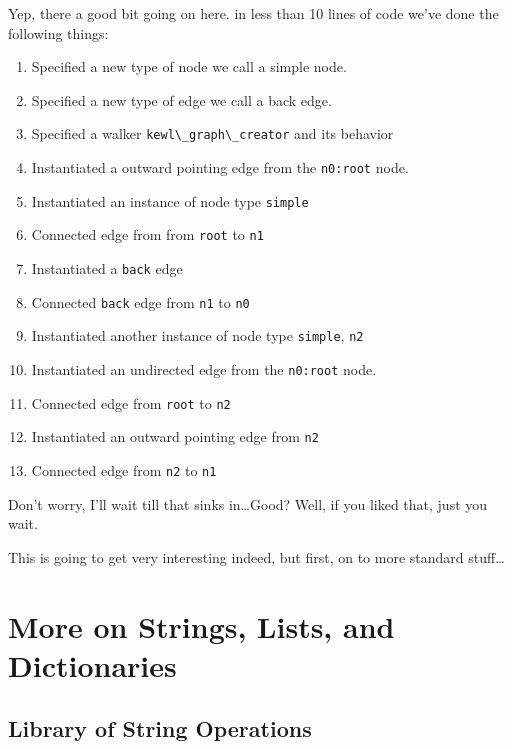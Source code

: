 Yep, there a good bit going on here. in less than 10 lines of code we've done the following things:
\begin{enumerate}[itemsep=0mm]
    \footnotesize
    \item Specified a new type of node we call a simple node.
    \item Specified a new type of edge we call a back edge.
    \item Specified a walker \lstinline{kewl\_graph\_creator} and its behavior
    \item Instantiated a outward pointing edge from the \lstinline{n0:root} node.
    \item Instantiated an instance of node type \lstinline{simple}
    \item Connected edge from from \lstinline{root} to \lstinline{n1}
    \item Instantiated a \lstinline{back} edge
    \item Connected \lstinline{back} edge from \lstinline{n1} to \lstinline{n0}
    \item Instantiated another instance of node type \lstinline{simple}, \lstinline{n2}
    \item Instantiated an undirected edge from the \lstinline{n0:root} node.
    \item Connected edge from \lstinline{root} to \lstinline{n2}
    \item Instantiated an outward pointing edge from \lstinline{n2}
    \item Connected edge from \lstinline{n2} to \lstinline{n1}
\end{enumerate}

Don't worry, I'll wait till that sinks in\dots Good? Well, if you liked that, just you wait.
\par
This is going to get very interesting indeed, but first,  on to more standard stuff\dots




\section{More on Strings, Lists, and Dictionaries}
\par
{}
\par
{}
\subsection{Library of String Operations}
\printtabStrOps
